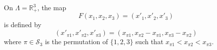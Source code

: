 On $\Lambda=\mathbb{R}^3_+$, the map
\[
F (x_1,x_2,x_3) = (x'_1,x'_2,x'_3)
\]
is defined by
\[
    (x'_{\pi 1}, x'_{\pi 2}, x'_{\pi 3}) =
    (x_{\pi 1}, x_{\pi 2}-x_{\pi 1}, x_{\pi 3}-x_{\pi 2})
\]
where $\pi\in\mathcal{S}_3$ is the permutation of $\{1,2,3\}$ such that
$x_{\pi 1}<x_{\pi 2}<x_{\pi 3}$.
